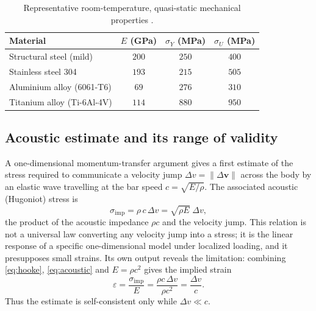 \documentclass[11pt]{article}
\begin{document}
	\begin{table}[htbp]
		\centering
		\begin{tabular}{@{}lccc@{}}
			\toprule
			Material & $E$ (GPa) & $\sigma_Y$ (MPa) & $\sigma_U$ (MPa) \\
			\midrule
			Structural steel (mild) & $200$ & $250$ & $400$ \\
			Stainless steel 304 & $193$ & $215$ & $505$ \\
			Aluminium alloy (6061-T6) & $69$ & $276$ & $310$ \\
			Titanium alloy (Ti-6Al-4V) & $114$ & $880$ & $950$ \\
			\bottomrule
		\end{tabular}
		\caption{Representative room-temperature, quasi-static mechanical
			properties \cite{AmeswebSteel,ASM2000,MatWeb}.}
		\label{tab:materials}
	\end{table}
	
	\subsection{Acoustic estimate and its range of validity}
	
	A one-dimensional momentum-transfer argument gives a first estimate of
	the stress required to communicate a velocity jump $\Delta v=\|\Delta
	\mathbf v\|$ across the body by an elastic wave travelling at the bar
	speed $c=\sqrt{E/\rho}$. The associated acoustic (Hugoniot) stress is
	\begin{equation}
		\sigma_{\mathrm{imp}}=\rho\,c\,\Delta v=\sqrt{\rho E}\;\Delta v,
		\label{eq:acoustic}
	\end{equation}
	the product of the acoustic impedance $\rho c$ and the velocity jump.
	This relation is not a universal law converting any velocity jump into a
	stress; it is the linear response of a specific one-dimensional model
	under localized loading, and it presupposes small strains. Its own
	output reveals the limitation: combining \eqref{eq:hooke},
	\eqref{eq:acoustic} and $E=\rho c^2$ gives the implied strain
	\begin{equation}
		\varepsilon=\frac{\sigma_{\mathrm{imp}}}{E}
		=\frac{\rho c\,\Delta v}{\rho c^{2}}=\frac{\Delta v}{c}.
		\label{eq:strain}
	\end{equation}
	Thus the estimate is self-consistent only while $\Delta v\ll c$.
	
\end{document}
